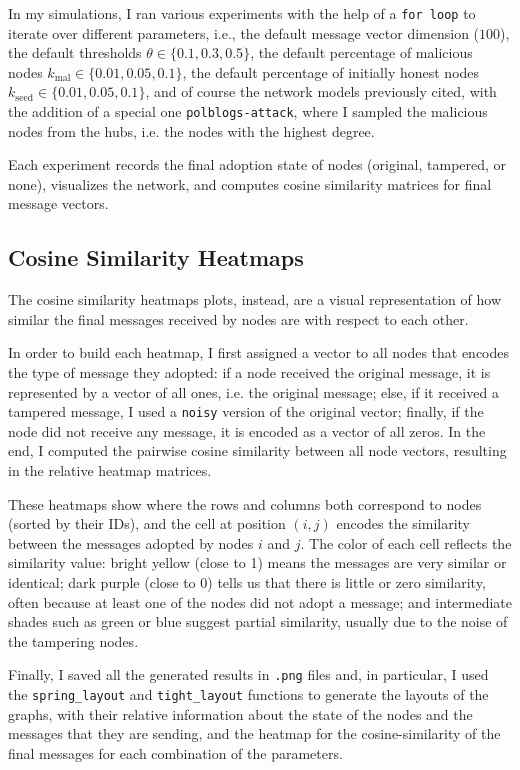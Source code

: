 \documentclass{article}
\begin{document}
In my simulations, I ran various experiments with the help of a \texttt{for loop} to iterate over different parameters, i.e., the default message vector dimension ($100$), the default thresholds $\theta\in\{0.1,0.3,0.5\}$, the default percentage of malicious nodes $k_\text{mal}\in\{0.01,0.05,0.1\}$, the default percentage of initially honest nodes $k_\text{seed}\in\{0.01,0.05,0.1\}$, and of course the network models previously cited, with the addition of a special one \texttt{polblogs-attack}, where I sampled the malicious nodes from the hubs, i.e. the nodes with the highest degree.

Each experiment records the final adoption state of nodes (original, tampered, or none), visualizes the network, and computes cosine similarity matrices for final message vectors.

\subsection{Cosine Similarity Heatmaps}
The cosine similarity heatmaps plots, instead, are a visual representation of how similar the final messages received by nodes are with respect to each other. 

In order to build each heatmap, I first assigned a vector to all nodes that encodes the type of message they adopted: if a node received the original message, it is represented by a vector of all ones, i.e. the original message; else, if it received a tampered message, I used a \texttt{noisy} version of the original vector; finally, if the node did not receive any message, it is encoded as a vector of all zeros. 
In the end, I computed the pairwise cosine similarity between all node vectors, resulting in the relative heatmap matrices.

These heatmaps show where the rows and columns both correspond to nodes (sorted by their IDs), and the cell at position $(i,j)$ encodes the similarity between the messages adopted by nodes $i$ and $j$. The color of each cell reflects the similarity value: bright yellow (close to 1) means the messages are very similar or identical; dark purple (close to 0) tells us that there is little or zero similarity, often because at least one of the nodes did not adopt a message; and intermediate shades such as green or blue suggest partial similarity, usually due to the noise of the tampering nodes.

Finally, I saved all the generated results in \texttt{.png} files and, in particular, I used the \texttt{spring\_layout} and \texttt{tight\_layout} functions to generate the layouts of the graphs, with their relative information about the state of the nodes and the messages that they are sending, and the heatmap for the cosine-similarity of the final messages for each combination of the parameters.
\end{document}
